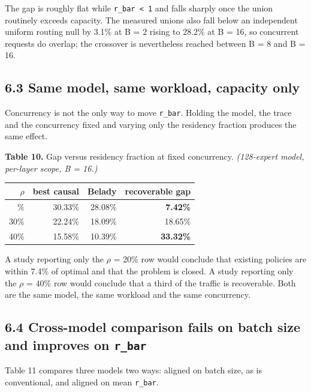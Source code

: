 \documentclass[
  10pt,
  letterpaper,
  10pt]{article}
\newcounter{none} %
\begin{document}
The gap is roughly flat while \texttt{r\_bar\ \textless{}\ 1} and falls
sharply once the union routinely exceeds capacity. The measured unions
also fall below an independent uniform routing null by 3.1\% at B = 2
rising to 28.2\% at B = 16, so concurrent requests do overlap; the
crossover is nevertheless reached between B = 8 and B = 16.

\subsection{6.3 Same model, same workload, capacity
only}\label{same-model-same-workload-capacity-only}

Concurrency is not the only way to move \texttt{r\_bar}. Holding the
model, the trace and the concurrency fixed and varying only the
residency fraction produces the same effect.

\textbf{Table 10.} Gap versus residency fraction at fixed concurrency.
\emph{(128-expert model, per-layer scope, B = 16.)}

{\def\LTcaptype{none} %
\begin{longtable}[]{@{}rrrr@{}}
\toprule\noalign{}
\(\rho\) & best causal & Belady & recoverable gap \\
\midrule\noalign{}
\endhead
\bottomrule\noalign{}
\endlastfoot
20\% & 30.33\% & 28.08\% & \textbf{7.42\%} \\
30\% & 22.24\% & 18.09\% & 18.65\% \\
40\% & 15.58\% & 10.39\% & \textbf{33.32\%} \\
\end{longtable}
}

A study reporting only the \(\rho\) = 20\% row would conclude that
existing policies are within 7.4\% of optimal and that the problem is
closed. A study reporting only the \(\rho\) = 40\% row would conclude
that a third of the traffic is recoverable. Both are the same model, the
same workload and the same concurrency.

\subsection{\texorpdfstring{6.4 Cross-model comparison fails on batch
size and improves on
\texttt{r\_bar}}{6.4 Cross-model comparison fails on batch size and improves on r\_bar}}\label{cross-model-comparison-fails-on-batch-size-and-improves-on-r_bar}

Table 11 compares three models two ways: aligned on batch size, as is
conventional, and aligned on mean \texttt{r\_bar}.
\end{document}
